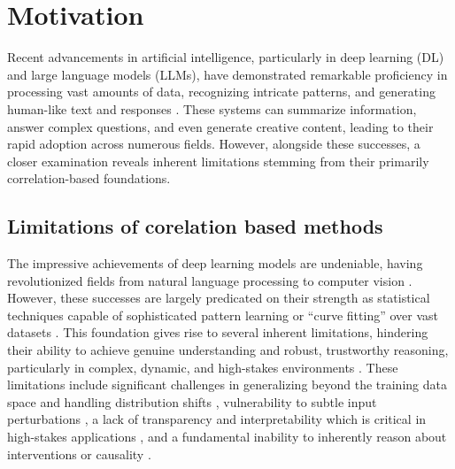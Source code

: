 \section{Motivation}
\label{sec:motivation}

Recent advancements in artificial intelligence, particularly in deep learning (DL) and large language models (LLMs), have demonstrated remarkable proficiency in processing vast amounts of data, recognizing intricate patterns, and generating human-like text and responses \cite{lecun2015deep, schmidhuber2015deep, goodfellow2016Deep}. These systems can summarize information, answer complex questions, and even generate creative content, leading to their rapid adoption across numerous fields. However, alongside these successes, a closer examination reveals inherent limitations stemming from their primarily correlation-based foundations.

\subsection{Limitations of corelation based methods}
\label{subsec:limits}   

The impressive achievements of deep learning models are undeniable, having revolutionized fields from natural language processing to computer vision \cite{lecun2015deep, schmidhuber2015deep,goodfellow2016Deep, Scholkopf2021Toward}. However, these successes are largely predicated on their strength as statistical techniques capable of sophisticated pattern learning or ``curve fitting'' over vast datasets \cite{pearl2018theoretical, Scholkopf2021Toward}. This foundation gives rise to several inherent limitations, hindering their ability to achieve genuine understanding and robust, trustworthy reasoning, particularly in complex, dynamic, and high-stakes environments \cite{pearl2018theoretical, Scholkopf2021Toward, Kaddour2022Causal}. These limitations include significant challenges in generalizing beyond the training data space and handling distribution shifts \cite{Scholkopf2021Toward}, vulnerability to subtle input perturbations \cite{Scholkopf2021Toward}, a lack of transparency and interpretability which is critical in high-stakes applications \cite{Scholkopf2021Toward}, and a fundamental inability to inherently reason about interventions or causality \cite{pearl2018theoretical, Scholkopf2021Toward, Kaddour2022Causal}.

